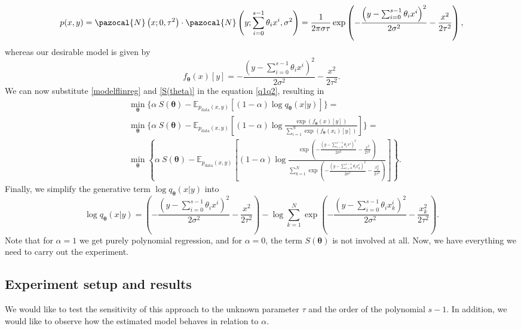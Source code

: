 \begin{equation}
	p(x,y) = \pazocal{N}\left(x;0,\tau^2\right) \cdot \pazocal{N}\left(y;\sum_{i=0}^{s-1} \theta_i x^i, \sigma^2 \right)  =  \frac{1}{2\pi\sigma\tau}\exp\left(-\frac{\left(y-\sum_{i=0}^{s-1} \theta_i x^i\right)^2}{2\sigma^2}-\frac{x^2}{2\tau^2}\right),
\end{equation}
whereas our desirable model is given by
\begin{equation}\label{modelflinreg}
	f_{\boldsymbol{\theta}}(x)[y] = -\frac{\left(y-\sum_{i=0}^{s-1} \theta_i x^i\right)^2}{2\sigma^2} - \frac{x^2}{2\tau^2}.
\end{equation}
We can now substitute \eqref{modelflinreg} and \eqref{S(theta)} in the equation \eqref{q1q2}, resulting in
\begin{align}\label{eq:SSEq}
	&\min_{\boldsymbol{\theta}}\Big\lbrace \alpha~S(\boldsymbol{\theta}) - \mathbb{E}_{p_{\mathrm{data}}(x,y)}\left[ \left(1-\alpha\right)\log q_{\boldsymbol{\theta}}\left(x|y\right) \right] \Big\rbrace  =\\
	&\min_{\boldsymbol{\theta}}\Bigg\lbrace \alpha~S(\boldsymbol{\theta}) - \mathbb{E}_{p_{\mathrm{data}}(x,y)}\left[ \left(1-\alpha\right)\log \frac{\exp\left({f_{\boldsymbol{\theta}}\left(x\right)[y]}\right)}{\sum_{i=1}^N\exp\left({f_{\boldsymbol{\theta}}\left(x_i\right)[y]}\right)} \right] \Bigg\rbrace  =\\
	&\min_{\boldsymbol{\theta}}\left\lbrace \alpha~S(\boldsymbol{\theta}) - \mathbb{E}_{p_{\mathrm{data}}(x,y)}\left[ \left(1-\alpha\right)\log \frac{\exp\left({-\frac{\left(y- \sum_{i=0}^{s-1} \theta_i x^i     \right)^2}{2\sigma^2} - \frac{x^2}{2\tau^2}}\right)}{\sum_{k=1}^N\exp\left({-\frac{\left(y-\sum_{i=0}^{s-1} \theta_i x_k^i\right)^2}{2\sigma^2} - \frac{x_k^2}{2\tau^2}}\right)} \right] \right\rbrace.  
\end{align}
Finally, we simplify the generative term $\log q_{\boldsymbol{\theta}}\left(x|y\right)$ into
\begin{equation}
	\log q_{\boldsymbol{\theta}}\left(x|y\right) =  \left(-\frac{\left(y-\sum_{i=0}^{s-1} \theta_i x^i\right)^2}{2\sigma^2} - \frac{x^2}{2\tau^2}\right) - \log \sum_{k=1}^N\exp\left({-\frac{\left(y-\sum_{i=0}^{s-1} \theta_i x_k^i\right)^2}{2\sigma^2} - \frac{x_k^2}{2\tau^2}}\right).
\end{equation}
Note that for $\alpha =1$ we get purely polynomial regression, and for $\alpha =0$, the term $S(\boldsymbol{\theta})$ is not involved at all. Now, we have everything we need to carry out the experiment.
\subsection{Experiment setup and results}
We would like to test the sensitivity of this approach to the unknown parameter $\tau$ and the order of the polynomial $s-1$. In addition, we would like to observe how the estimated model behaves in relation to $\alpha$. 

